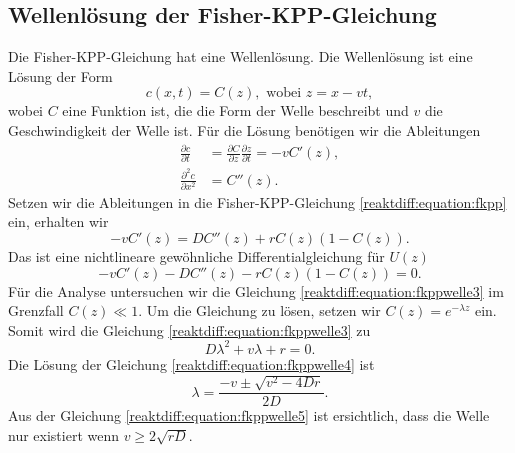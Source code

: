 \subsection{Wellenlösung der Fisher-KPP-Gleichung
\label{reaktdiff:subsection:fkppwelle}}
Die Fisher-KPP-Gleichung hat eine Wellenlösung.
Die Wellenlösung ist eine Lösung der Form
\begin{equation}
\label{reaktdiff:equation:fkppwelle}
c(x,t) = C(z), \text{ wobei } z = x - vt,
\end{equation}
wobei \(C\) eine Funktion ist, die die Form der Welle beschreibt und \(v\) die Geschwindigkeit der Welle ist.
Für die Lösung benötigen wir die Ableitungen
\begin{align*}
\frac{\partial c}{\partial t} &= \frac{\partial C}{\partial z}\frac{\partial z}{\partial t} = -vC'(z),
\\
\frac{\partial^2 c}{\partial x^2} &= C''(z).
\end{align*}
Setzen wir die Ableitungen in die Fisher-KPP-Gleichung \ref{reaktdiff:equation:fkpp} ein, erhalten wir
\begin{equation}
\label{reaktdiff:equation:fkppwelle2}
-vC'(z) = D C''(z) + rC(z)(1-C(z)).
\end{equation}
Das ist eine nichtlineare gewöhnliche Differentialgleichung für \(U(z)\)
\begin{equation}
    \label{reaktdiff:equation:fkppwelle3}
    -vC'(z) - D C''(z) - rC(z)(1-C(z)) = 0.
\end{equation}
Für die Analyse untersuchen wir die Gleichung \ref{reaktdiff:equation:fkppwelle3} im Grenzfall \(C(z) \ll 1\).
Um die Gleichung zu lösen, setzen wir \(C(z) = e^{-\lambda z}\) ein.
Somit wird die Gleichung \ref{reaktdiff:equation:fkppwelle3} zu
\begin{equation}
\label{reaktdiff:equation:fkppwelle4}
D\lambda^2 + v\lambda + r = 0.
\end{equation}
Die Lösung der Gleichung \ref{reaktdiff:equation:fkppwelle4} ist
\begin{equation}
\label{reaktdiff:equation:fkppwelle5}
\lambda = \frac{-v \pm \sqrt{v^2 - 4Dr}}{2D}.
\end{equation}
Aus der Gleichung \ref{reaktdiff:equation:fkppwelle5} ist ersichtlich, dass die Welle nur existiert wenn \(v \ge 2\sqrt{rD}\).

